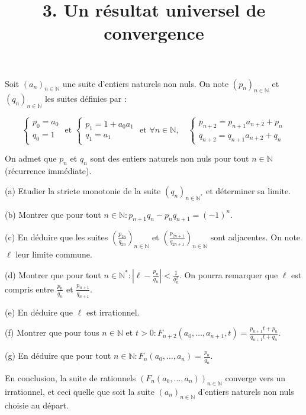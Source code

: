 \documentclass[10pt]{article}
\title{3. Un résultat universel de convergence }
\author{}
\date{}
\begin{document}
\maketitle
Soit $\left(a_{n}\right)_{n \in \mathbb{N}}$ une suite d'entiers naturels non nuls. On note $\left(p_{n}\right)_{n \in \mathbb{N}}$ et $\left(q_{n}\right)_{n \in \mathbb{N}}$ les suites définies par :

$$
\left\{\begin{array} { l } 
{ p _ { 0 } = a _ { 0 } } \\
{ q _ { 0 } = 1 }
\end{array} \text { et } \left\{\begin{array}{l}
p_{1}=1+a_{0} a_{1} \\
q_{1}=a_{1}
\end{array} \text { et } \forall n \in \mathbb{N}, \quad\left\{\begin{array}{l}
p_{n+2}=p_{n+1} a_{n+2}+p_{n} \\
q_{n+2}=q_{n+1} a_{n+2}+q_{n}
\end{array}\right.\right.\right.
$$

On admet que $p_{n}$ et $q_{n}$ sont des entiers naturels non nuls pour tout $n \in \mathbb{N}$ (récurrence immédiate).

(a) Etudier la stricte monotonie de la suite $\left(q_{n}\right)_{n \in \mathbb{N}^{*}}$ et déterminer sa limite.

(b) Montrer que pour tout $n \in \mathbb{N}: p_{n+1} q_{n}-p_{n} q_{n+1}=(-1)^{n}$.

(c) En déduire que les suites $\left(\frac{p_{2 n}}{q_{2 n}}\right)_{n \in \mathbb{N}}$ et $\left(\frac{p_{2 n+1}}{q_{2 n+1}}\right)_{n \in \mathbb{N}}$ sont adjacentes. On note $\ell$ leur limite commune.

(d) Montrer que pour tout $n \in \mathbb{N}^{*}:\left|\ell-\frac{p_{n}}{q_{n}}\right|<\frac{1}{q_{n}^{2}}$. On pourra remarquer que $\ell$ est compris entre $\frac{p_{n}}{q_{n}}$ et $\frac{p_{n+1}}{q_{n+1}}$.

(e) En déduire que $\ell$ est irrationnel.

(f) Montrer que pour tous $n \in \mathbb{N}$ et $t>0: F_{n+2}\left(a_{0}, \ldots, a_{n+1}, t\right)=\frac{p_{n+1} t+p_{n}}{q_{n+1} t+q_{n}}$.

(g) En déduire que pour tout $n \in \mathbb{N}: F_{n}\left(a_{0}, \ldots, a_{n}\right)=\frac{p_{n}}{q_{n}}$.

En conclusion, la suite de rationnels $\left(F_{n}\left(a_{0}, \ldots, a_{n}\right)\right)_{n \in \mathbb{N}}$ converge vers un irrationnel, et ceci quelle que soit la suite $\left(a_{n}\right)_{n \in \mathbb{N}}$ d'entiers naturels non nuls choisie au départ.
\end{document}

